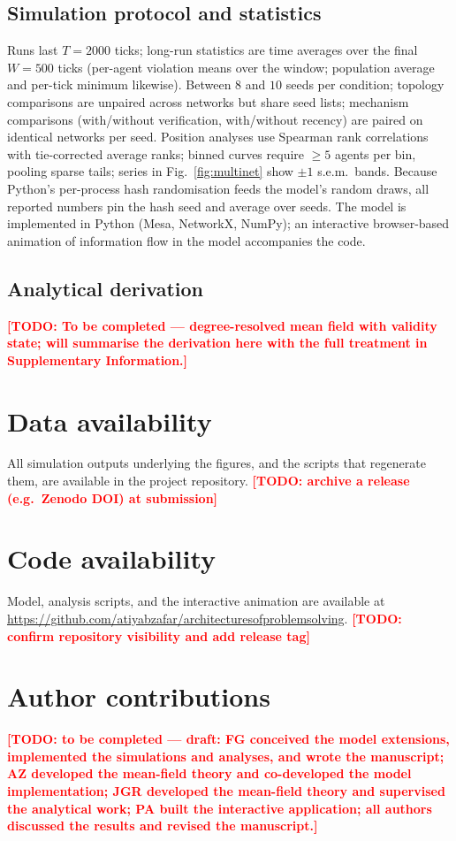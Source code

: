 \documentclass{article}
\newcommand{\todo}[1]{\textcolor{red}{\textbf{[TODO: #1]}}}
\begin{document}
\subsection{Simulation protocol and statistics}

Runs last $T=2000$ ticks; long-run statistics are time averages over the final $W=500$ ticks (per-agent violation means over the window; population average and per-tick minimum likewise). Between $8$ and $10$ seeds per condition; topology comparisons are unpaired across networks but share seed lists; mechanism comparisons (with/without verification, with/without recency) are paired on identical networks per seed. Position analyses use Spearman rank correlations with tie-corrected average ranks; binned curves require $\geq 5$ agents per bin, pooling sparse tails; series in Fig.~\ref{fig:multinet} show $\pm 1$ s.e.m.\ bands. Because Python's per-process hash randomisation feeds the model's random draws, all reported numbers pin the hash seed and average over seeds. The model is implemented in Python (Mesa, NetworkX, NumPy); an interactive browser-based animation of information flow in the model accompanies the code.

\subsection{Analytical derivation}

\todo{To be completed --- degree-resolved mean field with validity state; will summarise the derivation here with the full treatment in Supplementary Information.}


\section*{Data availability}
All simulation outputs underlying the figures, and the scripts that regenerate them, are available in the project repository. \todo{archive a release (e.g.\ Zenodo DOI) at submission}

\section*{Code availability}
Model, analysis scripts, and the interactive animation are available at \url{https://github.com/atiyabzafar/architecturesofproblemsolving}. \todo{confirm repository visibility and add release tag}

\section*{Author contributions}
\todo{to be completed --- draft: FG conceived the model extensions, implemented the simulations and analyses, and wrote the manuscript; AZ developed the mean-field theory and co-developed the model implementation; JGR developed the mean-field theory and supervised the analytical work; PA built the interactive application; all authors discussed the results and revised the manuscript.}
\end{document}
